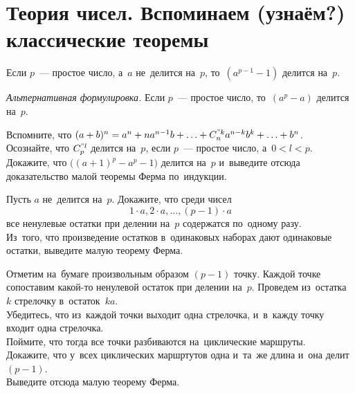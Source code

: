 
\section*{Теория чисел. Вспоминаем (узнаём?) классические теоремы}


Если $p$~--- простое число, а~$a$ не~делится на~$p$, то~$(a^{p-1} - 1)$ делится на~$p$.
\par
\emph{Альтернативная формулировка.}
Если $p$~--- простое число, то~$(a^p - a)$ делится на~$p$.

\begin{problems}

\item
\subproblem
Вспомните, что
\(
    (a + b)^n
=
    a^n + n a^{n-1} b +
    \ldots +
    C_{n}^{"k} a^{n-k} b^k +
    \ldots +
    b^n
\).
\\
\subproblem
Осознайте, что $C_{p}^{"l}$ делится на~$p$, если $p$~--- простое число,
а~$0 < l < p$.
\\
\subproblem
Докажите, что $\bigl( (a + 1)^p - a^p - 1 \bigr)$ делится на~$p$ и~выведите
отсюда доказательство малой теоремы Ферма по~индукции.

\item
\subproblem
Пусть $a$ не~делится на~$p$.
Докажите, что среди чисел
\[
    1 \cdot a, 2 \cdot a, \ldots, (p - 1) \cdot a
\]
все ненулевые остатки при делении на~$p$ содержатся по~одному разу.
\\
\subproblem
\label{algebra/number-theory/eulers-theorem-g9r2:problem:fermat-proof-1}%
Из~того, что произведение остатков в~одинаковых наборах дают одинаковые
остатки, выведите малую теорему Ферма.

\item
\label{algebra/number-theory/eulers-theorem-g9r2:problem:fermat-proof-2}%
Отметим на~бумаге произвольным образом $(p - 1)$ точку.
Каждой точке сопоставим какой-то ненулевой остаток при делении на~$p$.
Проведем из~остатка~$k$ стрелочку в~остаток~$k a$.
\\
\subproblem
Убедитесь, что из~каждой точки выходит одна стрелочка, и~в~кажду точку входит
одна стрелочка.
\\
\subproblem
Поймите, что тогда все точки разбиваются на~циклические маршруты.
\\
\subproblem
Докажите, что у~всех циклических маршртутов одна и~та~же длина и~она делит
$(p - 1)$.
\\
\subproblem
Выведите отсюда малую теорему Ферма.

\end{problems}

